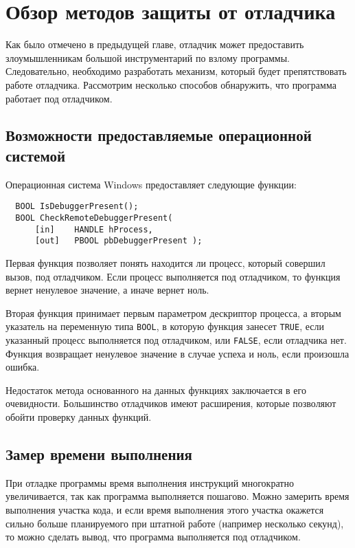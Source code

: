 
\section{Обзор методов защиты от отладчика}
Как было отмечено в предыдущей главе, отладчик может предоставить
злоумышленникам большой инструментарий по взлому программы. Следовательно,
необходимо разработать механизм, который будет препятствовать работе отладчика.
Рассмотрим несколько способов обнаружить, что программа работает под отладчиком.

\subsection{Возможности предоставляемые операционной системой}
Операционная система Windows предоставляет следующие функции:
\begin{verbatim}
  BOOL IsDebuggerPresent();
  BOOL CheckRemoteDebuggerPresent(
      [in]    HANDLE hProcess,
      [out]   PBOOL pbDebuggerPresent );
\end{verbatim}

Первая функция позволяет понять находится ли процесс, который совершил вызов,
под отладчиком. Если процесс выполняется под отладчиком, то функция вернет
ненулевое значение, а иначе вернет ноль.

Вторая функция принимает первым параметром дескриптор процесса, а вторым
указатель на переменную типа \verb!BOOL!, в которую функция занесет \verb!TRUE!,
если указанный процесс выполняется под отладчиком, или \verb!FALSE!, если
отладчика нет. Функция возвращает ненулевое значение в случае успеха и ноль,
если произошла ошибка.

Недостаток метода основанного на данных функциях заключается в его очевидности.
Большинство отладчиков имеют расширения, которые позволяют обойти проверку
данных функций.

\subsection{Замер времени выполнения}
При отладке программы время выполнения инструкций многократно увеличивается, так
как программа выполняется пошагово. Можно замерить время выполнения участка
кода, и если время выполнения этого участка окажется сильно больше планируемого
при штатной работе (например несколько секунд), то можно сделать вывод, что
программа выполняется под отладчиком.

